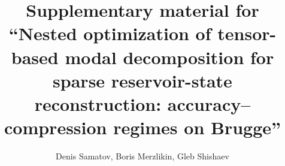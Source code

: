 \documentclass[preprint,12pt]{elsarticle}
\begin{document}
\begin{frontmatter}
\title{Supplementary material for ``Nested optimization of tensor-based modal decomposition for sparse reservoir-state reconstruction: accuracy--compression regimes on Brugge''}
\author{Denis Samatov, Boris Merzlikin, Gleb Shishaev}
\end{frontmatter}









\clearpage


\end{document}
